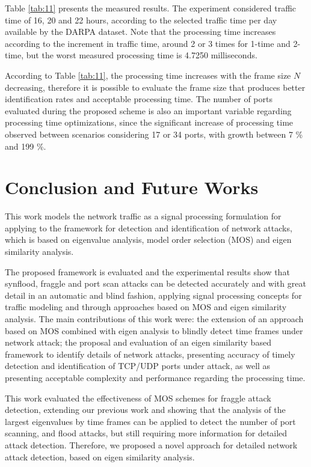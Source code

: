 Table \ref{tab:11} presents the measured results. The experiment considered traffic time of 16, 20 and 22 hours, according to the selected traffic time per day available by the DARPA dataset. Note that the processing time increases according to the increment in traffic time, around 2 or 3 times for 1-time and 2-time, but the worst measured processing time is 4.7250 milliseconds.

According to Table \ref{tab:11}, the processing time increases with the frame size $N$ decreasing, therefore it is possible to evaluate the frame size that produces better identification rates and acceptable processing time. The number of ports evaluated during the proposed scheme is also an important variable regarding processing time optimizations, since the significant increase of processing time observed between scenarios considering 17 or 34 ports, with growth between 7 \% and 199 \%.


\section{Conclusion and Future Works}
\label{sec:2_conclusionandfutureworks}

This work models the network traffic as a signal processing formulation for applying to the framework for detection and identification of network attacks, which is based on eigenvalue analysis, model order selection (MOS) and eigen similarity analysis.

The proposed framework is evaluated and the experimental results show that synflood, fraggle and port scan attacks can be detected accurately and with great detail in an automatic and blind fashion, applying signal processing concepts for traffic modeling and through approaches based on MOS and eigen similarity analysis. The main contributions of this work were: the extension of an approach based on MOS combined with eigen analysis to blindly detect time frames under network attack; the proposal and evaluation of an eigen similarity based framework to identify details of network attacks, presenting accuracy of timely detection and identification of TCP/UDP ports under attack, as well as presenting acceptable complexity and performance regarding the processing time.

This work evaluated the effectiveness of MOS schemes for fraggle attack detection, extending our previous work \cite{tenorio2013greatest} and showing that the analysis of the largest eigenvalues by time frames can be applied to detect the number of port scanning, and flood attacks, but still requiring more information for detailed attack detection. Therefore, we proposed a novel approach for detailed network attack detection, based on eigen similarity analysis.


